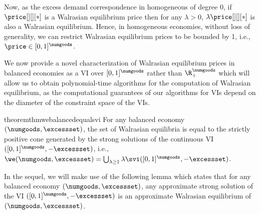 \begin{remark}\label{remark:homo_we_scaling}
    Now, as the excess demand correspondence in homogeneous of degree $0$, if $\price[][][*]$ is a Walrasian equilibrium price then for any $\lambda > 0$, $\lambda \price[][][*]$ is also a Walrasian equilibrium. Hence, in homogeneous economies, without loss of generality, we can restrict Walrasian equilibrium prices to be bounded by 1, i.e., $\price \in [0, 1]^\numgoods$.    
\end{remark}
\fi 

We now provide a novel characterization of Walrasian equilibrium prices in balanced economies as a VI over $[0, 1]^\numgoods$ rather than $\R^\numgoods_+$ which will allow us to obtain polynomial-time algorithms for the computation of Walrasian equilibrium, as the computational guarantees of our algorithms for VIs depend on the diameter of the constraint space of the VIs. 


\begin{restatable}{theorem}{thmwebalancedequalsvi}\label{thm:we_balanced_equal_svi}
    For any balanced economy $(\numgoods, \excessset)$, the set of Walrasian equilibria is equal to the strictly positive cone generated by the strong solutions of the continuous VI $([0, 1]^\numgoods, -\excessset)$, i.e., $\we(\numgoods, \excessset) = \bigcup_{\lambda \geq 1} \lambda \svi([0, 1]^\numgoods, -\excessset)$.
\end{restatable}

In the sequel, we will make use of the following lemma which states that for any balanced economy $(\numgoods, \excessset)$, any approximate strong solution of the VI $([0, 1]^\numgoods, -\excessset)$ is an approximate Walrasian equilibrium of $(\numgoods, \excessset)$.

